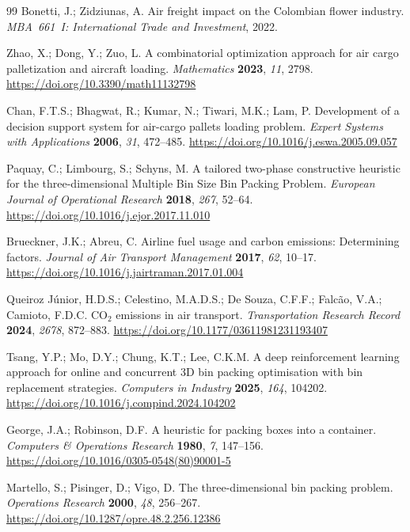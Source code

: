 \documentclass[12pt,a4paper]{article}
\begin{document}
\begin{thebibliography}{99}
Bonetti, J.; Zidziunas, A. Air freight impact on the Colombian flower
industry.
\textit{MBA~661~I: International Trade and Investment}, 2022.

Zhao, X.; Dong, Y.; Zuo, L. A combinatorial optimization approach for
air cargo palletization and aircraft loading.
\textit{Mathematics} \textbf{2023}, \textit{11}, 2798.
\url{https://doi.org/10.3390/math11132798}

Chan, F.T.S.; Bhagwat, R.; Kumar, N.; Tiwari, M.K.; Lam, P.
Development of a decision support system for air-cargo pallets loading
problem.
\textit{Expert Systems with Applications} \textbf{2006}, \textit{31},
472--485.
\url{https://doi.org/10.1016/j.eswa.2005.09.057}

Paquay, C.; Limbourg, S.; Schyns, M. A tailored two-phase
constructive heuristic for the three-dimensional Multiple Bin Size
Bin Packing Problem.
\textit{European Journal of Operational Research} \textbf{2018},
\textit{267}, 52--64.
\url{https://doi.org/10.1016/j.ejor.2017.11.010}

Brueckner, J.K.; Abreu, C. Airline fuel usage and carbon emissions:
Determining factors.
\textit{Journal of Air Transport Management} \textbf{2017},
\textit{62}, 10--17.
\url{https://doi.org/10.1016/j.jairtraman.2017.01.004}

Queiroz J\'{u}nior, H.D.S.; Celestino, M.A.D.S.; De Souza, C.F.F.;
Falc\~{a}o, V.A.; Camioto, F.D.C. CO$_2$ emissions in air transport.
\textit{Transportation Research Record} \textbf{2024}, \textit{2678},
872--883.
\url{https://doi.org/10.1177/03611981231193407}

Tsang, Y.P.; Mo, D.Y.; Chung, K.T.; Lee, C.K.M. A deep reinforcement
learning approach for online and concurrent 3D bin packing
optimisation with bin replacement strategies.
\textit{Computers in Industry} \textbf{2025}, \textit{164}, 104202.
\url{https://doi.org/10.1016/j.compind.2024.104202}

George, J.A.; Robinson, D.F. A heuristic for packing boxes into a
container.
\textit{Computers \& Operations Research} \textbf{1980}, \textit{7},
147--156.
\url{https://doi.org/10.1016/0305-0548(80)90001-5}

Martello, S.; Pisinger, D.; Vigo, D. The three-dimensional bin packing
problem.
\textit{Operations Research} \textbf{2000}, \textit{48}, 256--267.
\url{https://doi.org/10.1287/opre.48.2.256.12386}


\end{thebibliography}
\end{document}
